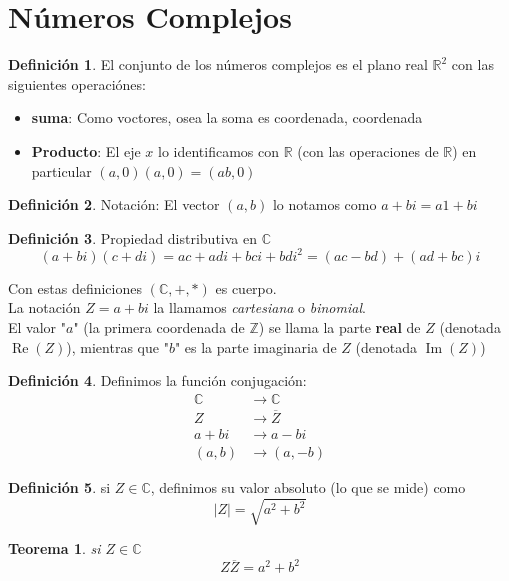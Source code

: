 \documentclass[9pt,a4paper,draft]{article}
\theoremstyle{definition}
\newtheorem{defi}{Definición}
\theoremstyle{plain}
\newtheorem{teo}{Teorema}
\DeclareMathOperator{\re}{Re}
\DeclareMathOperator{\im}{Im}
\begin{document}
\part{Números Complejos}

\begin{defi} El conjunto de los números complejos es el plano real $\mathbb{R}^2$ con las siguientes operaciónes:
\begin{itemize}
\item {\bfseries suma}: Como voctores, osea la soma es coordenada, coordenada
\item {\bfseries Producto}: El eje $x$ lo identificamos con $\mathbb{R}$ (con las operaciones de $\mathbb{R}$) en particular $(a,0)(a,0)=(ab,0)$ 
\end{itemize}
\end{defi}

\begin{defi} Notación: El vector $(a,b)$ lo notamos como $a+bi = a1+bi$\end{defi}

\begin{defi} Propiedad distributiva en $\mathbb{C}$
$$(a+bi)(c+di) = ac + adi + bci + bdi^2 = (ac-bd)+(ad+bc)i$$
\end{defi}

Con estas definiciones $(\mathbb{C}, +, *)$ es cuerpo.\\
La notación $Z=a+bi$ la llamamos {\itshape cartesiana} o {\itshape binomial}.\\
El valor "$a$" (la primera coordenada de $\mathbb{Z}$) se llama la parte {\bfseries real} de $Z$ (denotada $\re(Z)$), mientras que "$b$" es la parte imaginaria de $Z$ (denotada $\im(Z)$)

\begin{defi} Definimos la función conjugación:
\begin{align*}
\mathbb{C} &\to \mathbb{C}\\
Z &\to \overline{Z}\\
a+bi &\to a-bi\\
(a,b) &\to (a,-b)
\end{align*}
\end{defi}

\begin{defi} si $Z\in{\mathbb{C}}$, definimos su valor absoluto (lo que se mide) como
$$|Z| = \sqrt{a^2+b^2}$$
\end{defi}

\begin{teo} si $Z\in\mathbb{C}$
$$Z \overline{Z} = a^2+b^2$$
\end{teo}
\end{document}
